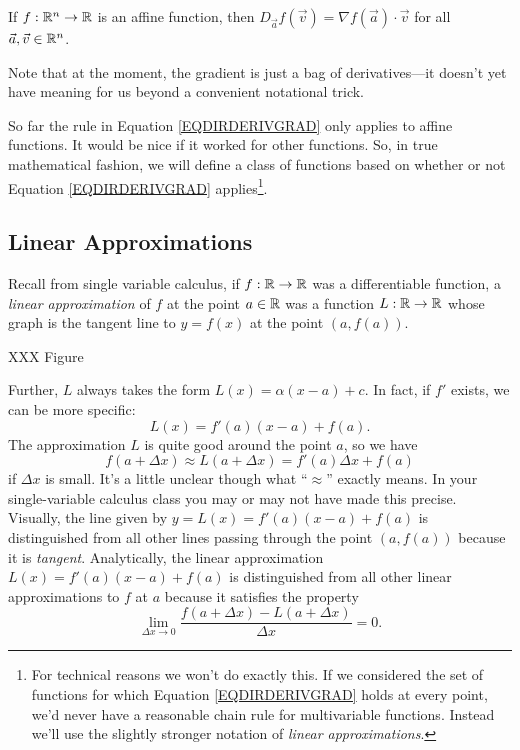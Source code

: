\begin{theorem}
	\label{THMAFFINEDERIV}
	If $f:\mathbb{R}^n\to\mathbb{R}$ is an affine function, then
	$
		D_{\vec a}f(\vec v) = \nabla f(\vec a)\cdot \vec v
	$
	for all $\vec a,\vec v\in\mathbb{R}^n$.
\end{theorem}

Note that at the moment, the gradient is just a bag of derivatives---it
doesn't yet have meaning for us beyond a convenient notational trick.

So far the rule in Equation \eqref{EQDIRDERIVGRAD} only applies to affine functions.
It would be nice if it worked for other functions.  So, in true mathematical
fashion, we will define a class of functions based on whether or not Equation
\eqref{EQDIRDERIVGRAD} applies\footnote{ For technical reasons we won't do exactly this.
If we considered the set of functions for which Equation \eqref{EQDIRDERIVGRAD}
holds at every point, we'd never have a reasonable chain rule for multivariable
functions.  Instead we'll use the slightly stronger notation of \emph{linear approximations}.}.

\subsection{Linear Approximations}

Recall from single variable calculus, if $f:\mathbb{R}\to\mathbb{R}$ was a differentiable function,
a \emph{linear approximation} of $f$ at the point $a\in\mathbb{R}$ was a function $L:\mathbb{R}\to\mathbb{R}$
whose graph is the tangent line to $y=f(x)$ at the point $(a,f(a))$.

XXX Figure

Further, $L$ always takes the form $L(x)=\alpha(x-a)+c$.  In fact, if $f'$ exists,
we can be more
specific:  \[L(x)=f'(a)(x-a)+f(a).\]
The approximation $L$ is quite good around the point $a$, so we have
\[
	f(a+\Delta x)\approx L(a+\Delta x) = f'(a)\Delta x+f(a)
\]
if $\Delta x$ is small.  It's a little unclear though what ``$\approx$''
exactly means.  In your single-variable calculus class you may or may not
have made this precise.  Visually, the line given by $y=L(x)=f'(a)(x-a)+f(a)$
is distinguished from all other lines passing through the point $(a,f(a))$ because
it is \emph{tangent}.  Analytically, the linear approximation $L(x)=f'(a)(x-a)+f(a)$
is distinguished from all other linear approximations to $f$ at $a$ because it satisfies
the property
\begin{equation}
	\label{EQONEVARLINAPPROX}
	\lim_{\Delta x\to 0} \frac{f(a+\Delta x)-L(a+\Delta x)}{\Delta x} = 0.
\end{equation}

